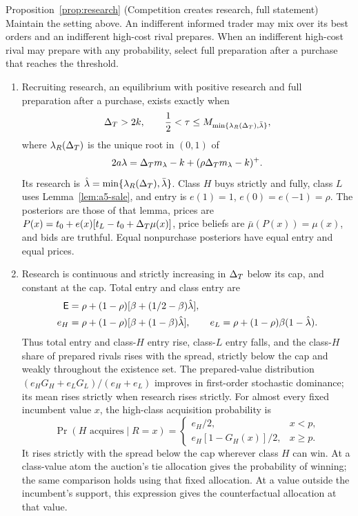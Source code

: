 \begin{named}{Proposition~\ref{prop:research} (Competition creates research, full statement)}
Maintain the setting above. An indifferent informed trader may mix over its best orders and an indifferent high-cost
rival prepares. When an indifferent high-cost rival may prepare with any probability, select full
preparation after a purchase that reaches the threshold.
\begin{enumerate}[label=(\alph*),leftmargin=2em]
\item Recruiting research, an equilibrium with positive research and full preparation after a purchase, exists
exactly when
\begin{equation}\label{eq:research-exist}
 \Delta_T>2k,\qquad \frac12<\tau\le M_{\min\{\lambda_R(\Delta_T),\bar\lambda\}},
\end{equation}
where \(\lambda_R(\Delta_T)\) is the unique root in \((0,1)\) of
\begin{equation}\label{eq:research-im}
 2a\lambda=\Delta_T m_\lambda-k+(\rho\Delta_T m_\lambda-k)^+.
\end{equation}
Its research is \(\hat\lambda=\min\{\lambda_R(\Delta_T),\bar\lambda\}\). Class \(H\) buys strictly and fully, class \(L\)
uses Lemma~\ref{lem:a5-sale}, and entry is \(e(1)=1\), \(e(0)=e(-1)=\rho\). The posteriors are those of that
lemma, prices are \(P(x)=t_0+e(x)[t_L-t_0+\Delta_T\mu(x)]\), price beliefs are
\(\bar\mu(P(x))=\mu(x)\), and bids are truthful. Equal nonpurchase posteriors have equal entry and equal prices.

\item Research is continuous and strictly increasing in \(\Delta_T\) below its cap, and constant at the cap.
Total entry and class entry are
\begin{align*}
 \mathsf{E}&=\rho+(1-\rho)[\beta+(1/2-\beta)\hat\lambda],\\
 e_H&=\rho+(1-\rho)[\beta+(1-\beta)\hat\lambda],\qquad
 e_L=\rho+(1-\rho)\beta(1-\hat\lambda).
\end{align*}
Thus total entry and class-\(H\) entry rise, class-\(L\) entry falls, and the class-\(H\) share of prepared
rivals rises with the spread, strictly below the cap and weakly throughout the existence set.
The prepared-value distribution
\((e_HG_H+e_LG_L)/(e_H+e_L)\) improves in first-order stochastic dominance; its mean rises strictly when research
rises strictly. For almost every fixed incumbent value \(x\), the high-class acquisition probability is
\[
 \Pr(H\text{ acquires}\mid R=x)=
 \begin{cases}e_H/2,&x<p,\\ e_H[1-G_H(x)]/2,&x\ge p.\end{cases}
\]
It rises strictly with the spread below the cap wherever class \(H\) can win. At a class-value atom the auction's
tie allocation gives the probability of winning; the same comparison holds using that fixed allocation.
At a value outside the incumbent's support, this expression gives the counterfactual allocation at that value.


\end{enumerate}
\end{named}
